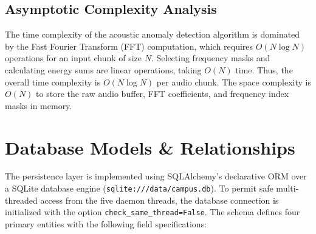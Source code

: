 \documentclass[12pt,a4paper,oneside]{report}
\begin{document}
\subsection{Asymptotic Complexity Analysis}
The time complexity of the acoustic anomaly detection algorithm is dominated by the Fast Fourier Transform (FFT) computation, which requires $O(N \log N)$ operations for an input chunk of size $N$. Selecting frequency masks and calculating energy sums are linear operations, taking $O(N)$ time. Thus, the overall time complexity is $O(N \log N)$ per audio chunk. The space complexity is $O(N)$ to store the raw audio buffer, FFT coefficients, and frequency index masks in memory.

\section{Database Models \& Relationships}
The persistence layer is implemented using SQLAlchemy's declarative ORM over a SQLite database engine (\texttt{sqlite:///data/campus.db}). To permit safe multi-threaded access from the five daemon threads, the database connection is initialized with the option \texttt{check\allowbreak{}\_same\allowbreak{}\_thread\allowbreak{}=False}. The schema defines four primary entities with the following field specifications:
\end{document}
